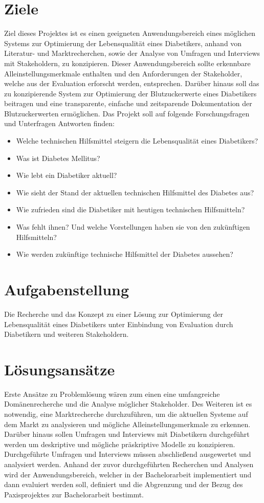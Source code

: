 \documentclass[a4paper, 12pt]{scrartcl}
\begin{document}
			\section{Ziele}
				Ziel dieses Projektes ist es einen geeigneten Anwendungsbereich eines möglichen Systems zur Optimierung der Lebensqualität eines Diabetikers, anhand von Literatur- und Marktrecherchen, sowie der Analyse von Umfragen und Interviews mit Stakeholdern, zu konzipieren. Dieser Anwendungsbereich sollte erkennbare Alleinstellungsmerkmale enthalten und den Anforderungen der Stakeholder, welche aus der Evaluation erforscht werden, entsprechen. Darüber hinaus soll das zu konzipierende System zur Optimierung der Blutzuckerwerte eines Diabetikers beitragen und eine transparente, einfache und zeitsparende Dokumentation der Blutzuckerwerten ermöglichen. Das Projekt soll auf folgende Forschungsfragen und Unterfragen Antworten finden:
				\begin{itemize}
					 
					\item Welche technischen Hilfsmittel steigern die Lebensqualität eines Diabetikers?
					\item Was ist Diabetes Mellitus?
					\item Wie lebt ein Diabetiker aktuell?
					\item Wie sieht der Stand der aktuellen technischen Hilfsmittel des Diabetes aus?
					\item Wie zufrieden sind die Diabetiker mit heutigen technischen Hilfsmitteln?
					\item Was fehlt ihnen? Und welche Vorstellungen haben sie von den zukünftigen Hilfsmitteln?
					\item Wie werden zukünftige technische Hilfsmittel der Diabetes aussehen?
				\end{itemize}
			
			\section{Aufgabenstellung}
				Die Recherche und das Konzept zu einer Lösung zur Optimierung der Lebensqualität eines Diabetikers unter Einbindung von Evaluation durch Diabetikern und weiteren Stakeholdern. 
			
			\section{Lösungsansätze}
				Erste Ansätze zu Problemlösung wären zum einen eine umfangreiche Domänenrecherche und die Analyse möglicher Stakeholder. Des Weiteren ist es notwendig, eine Marktrecherche durchzuführen, um die aktuellen Systeme auf dem Markt zu analysieren und mögliche Alleinstellungsmerkmale zu erkennen. Darüber hinaus sollen Umfragen und Interviews mit Diabetikern durchgeführt werden um deskriptive und mögliche präskriptive Modelle zu konzipieren. Durchgeführte Umfragen und Interviews müssen abschließend ausgewertet und analysiert werden. Anhand der zuvor durchgeführten Recherchen und Analysen wird der Anwendungsbereich, welcher in der Bachelorarbeit implementiert und dann evaluiert werden soll, definiert und die Abgrenzung und der Bezug des Paxisprojektes zur Bachelorarbeit bestimmt.
			
\end{document}

